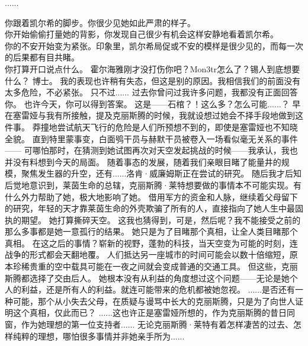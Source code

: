 \documentclass[openany]{book}
\begin{document}
\begin{dialogue}
     ......\par
    你跟着凯尔希的脚步。你很少见她如此严肃的样子。\\
    你开始偷偷打量她的背影，你发现自己很少有机会这样安静地看着凯尔希。\\
    你的不安开始变为紧张。印象里，凯尔希局促或不安的模样是很少见的，而每一次的后果都有目共睹。\\
    你打算开口说点什么。
     霍尔海雅刚才没打伤你吧？Mon3tr怎么了？锡人到底想要什么？
     博士。
     我的表现也许稍有失态，但这是别的原因。我相信我们的前面没有太多危险，不必紧张。
     只不过......
     过去你曾问过我许多问题，我都没有正面回答你。
     也许今天，你可以得到答案。
     这是——石棺？！这么多？怎么可能......？
     早在塞雷娅与我有所接触，提及克丽斯腾的时候，我就设想过她会不择手段地做到这件事。
     莽撞地尝试航天飞行的危险是人们所预想不到的，即使是塞雷娅也不知晓全貌。
     直到特里蒙事变，白面鸮干员与赫默干员被卷入一场看似毫无关系的事件——
     可哪怕那时，在猜测到她试图再次对天空发起挑战的时候——我承认，我也并没有料想到今天的局面。
     随着事态的发展，随着我们亲眼目睹了能量井的规模，聚焦发生器的升空，还有......洛肯·威廉姆斯正在尝试的研究。
     随后我才后知后觉地意识到，莱茵生命的总辖，克丽斯腾·莱特想要做的事情本不可能实现。有什么外力帮助了她，极大地影响了她。
     借用军方的资金和人脉，继续着父母留下的研究，年轻的天才靠莱茵生命的外壳欺骗了所有的人，直接指向了她人生中最固执的期望。
     她打算撕碎天空。
     这我也猜得到，可是，然后呢？我不能接受之前的那么多事都是她一意孤行的结果。
     她只是为了目睹那个真相，让全人类目睹那个真相。
     在这之后的事情？崭新的视野，蓬勃的科技，当天空变为可能的时刻，连战争的形式都会天翻地覆。
     人们抵达另一座城市的时间可能会以数十倍缩短，原本珍稀贵重的空中载具可能在一夜之间就会变成普通的交通工具。
     但这些，克丽斯腾都选择了交由后人。
     她根本没有从利益的角度想过这个问题——无论是她个人的利益，还是所有人的利益。就连可能带来的危机都被她忽视。
     ......是否还有一种可能，那个从小失去父母，在质疑与谩骂中长大的克丽斯腾，只是为了向世人证明这个真相，仅此而已？
     ......这也许正是塞雷娅所想的，作为克丽斯腾的昔日同窗，作为她理想的第一位支持者......
     无论克丽斯腾·莱特有着怎样凄苦的过去、怎样纯粹的理想，哪怕很多事情并非她亲手所为......

\end{dialogue}
\end{document}
